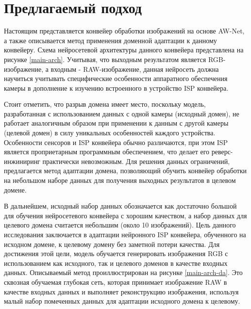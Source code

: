 \section{Предлагаемый подход}\label{sect-4}

Настоящим представляется конвейер обработки изображений на основе AW-Net, а также описывается метод применения доменной адаптации к данному конвейеру. Схема нейросетевой архитектуры данного конвейера представлена на рисунке \ref{main-arch}. Учитывая, что выходным результатом является RGB-изображение, а входным - RAW-изображение, данная нейросеть должна научиться учитывать специфические особенности аппаратного обеспечения камеры в дополнение к изучению встроенного в устройство ISP конвейера.


Стоит отметить, что разрыв домена имеет место, поскольку модель, разработанная с использованием данных с одной камеры (исходный домен), не работает аналогичным образом при применении к данным с другой камеры (целевой домен) в силу уникальных особенностей каждого устройства. Особенности сенсоров и ISP конвейера обычно различаются, при этом ISP является проприетарным программным обеспечением, что делает его реверс-инжиниринг практически невозможным. Для решения данных ограничений, предлагается метод адаптации домена, позволяющий обучить конвейер обработки на небольшом наборе данных для получения выходных результатов в целевом домене.


В дальнейшем, исходный набор данных обозначается как достаточно большой для обучения нейросетевого конвейера с хорошим качеством, а набор данных для целевого домена считается небольшим (около 10 изображений). Цель данного исследования заключается в адаптации нейронного ISP конвейера, обученного на исходном домене, к целевому домену без заметной потери качества. Для достижения этой цели, модель обучается генерировать изображения RGB с использованием как исходного, так и целевого доменов в качестве входных данных. Описываемый метод проиллюстрирован на рисунке \ref{main-arch-da}. Это сквозная обучаемая глубокая сеть, которая принимает изображение RAW в качестве входных данных и выполняет реконструкцию изображения, используя малый набор помеченных данных для адаптации исходного домена к целевому.

